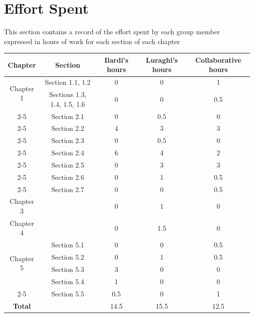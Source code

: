 \chapter{Effort Spent}
\label{Effort Spent}

This section contains a record of the effort spent by each group member expressed in hours of work for each section of each chapter

\begin{table}[h!]
\centering
\label{tab:example}
\begin{tabular}{|c|c|c|c|c|}
\hline
\textbf{Chapter} & \textbf{Section} & \textbf{Ilardi's hours} & \textbf{Luraghi's hours} & \textbf{Collaborative hours} \\ \hline
\multirow{2}{*}{Chapter 1} & Section 1.1, 1.2 & 0 & 0 & 1\\ \cline{2-5}
                           & Sections 1.3, 1.4, 1.5, 1.6 & 0 & 0 & 0.5 \\ \cline{2-5}
                            \hline
\multirow{7}{*}{Chapter 2} & Section 2.1 & 0 & 0.5 & 0 \\ \cline{2-5}
                           & Section 2.2 & 4 & 3 & 3 \\ \cline{2-5}
                           & Section 2.3 & 0 & 0.5 & 0 \\ \cline{2-5}
                           & Section 2.4 & 6 & 4 & 2 \\ \cline{2-5}
                           & Section 2.5 & 0 & 3 & 3 \\ \cline{2-5}
                           & Section 2.6 & 0 & 1 & 0.5 \\ \cline{2-5}
                           & Section 2.7 & 0 & 0 & 0.5 \\ \hline
\multirow{1}{*}{Chapter 3} &  & 0 & 1 & 0 \\ \hline
\multirow{1}{*}{Chapter 4} &  & 0 & 1.5 & 0 \\ \hline
\multirow{4}{*}{Chapter 5} & Section 5.1 & 0 & 0 & 0.5 \\ \cline{2-5}
                           & Section 5.2 & 0 & 1 & 0.5 \\ \cline{2-5}
                           & Section 5.3 & 3 & 0 & 0 \\ \cline{2-5}
                           & Section 5.4 & 1 & 0 & 0 \\ \cline{2-5}
                           & Section 5.5 & 0.5 & 0 & 1 \\ \hline
\multirow{1}{*}{\textbf{Total}} &  & 14.5 & 15.5 & 12.5 \\ \hline

\end{tabular}
\end{table}
